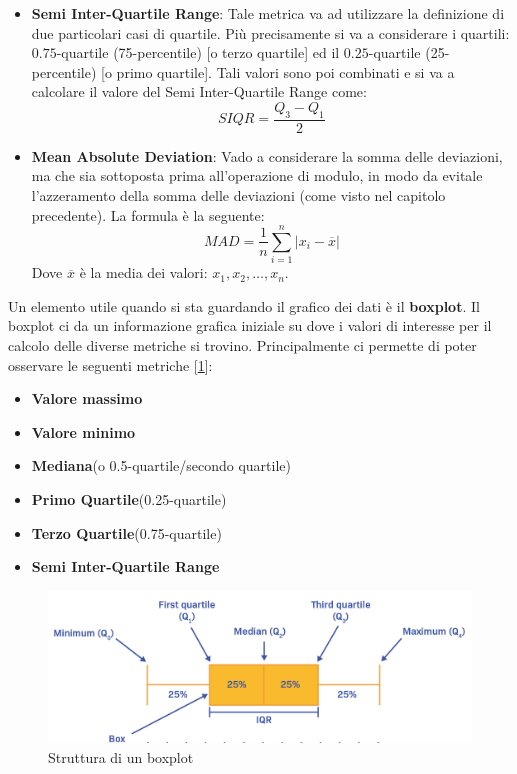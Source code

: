 \begin{itemize}
\item \textbf{Semi Inter-Quartile Range}: Tale metrica va ad utilizzare la definizione di due particolari casi di quartile. Più precisamente si va a considerare i quartili: \(0.75\)-quartile (75-percentile) [o terzo quartile] ed il \(0.25\)-quartile (25-percentile) [o primo quartile]. Tali valori sono poi combinati e si va a calcolare il valore del Semi Inter-Quartile Range come:
\[
SIQR = \frac{Q_3 - Q_1}{2}
\]

\item \textbf{Mean Absolute Deviation}: Vado a considerare la somma delle deviazioni, ma che sia sottoposta prima all'operazione di modulo, in modo da evitale l'azzeramento della somma delle deviazioni (come visto nel capitolo precedente). La formula è la seguente:
\[
MAD = \frac{1}{n}\sum_{i=1}^{n}|x_i - \overline{x}|
\]
Dove \(\overline{x}\) è la media dei valori: \(x_1,x_2, \dots, x_n\).

\end{itemize}

Un elemento utile quando si sta guardando il grafico dei dati è il \textbf{boxplot}. Il boxplot ci da un informazione grafica iniziale su dove i valori di interesse per il calcolo delle diverse metriche si trovino. Principalmente ci permette di poter osservare le seguenti metriche [\ref{img:boxplot}]:
\begin{itemize}
    \item \textbf{Valore massimo}
    \item \textbf{Valore minimo}
    \item \textbf{Mediana}(o 0.5-quartile/secondo quartile)
    \item \textbf{Primo Quartile}(0.25-quartile)
    \item \textbf{Terzo Quartile}(0.75-quartile)
    \item \textbf{Semi Inter-Quartile Range}
\end{itemize}

\begin{figure}[H]
\centering
\includegraphics[width=.7\textwidth]{img/chapter-4/boxplot.png}
\caption{Struttura di un boxplot}\label{img:boxplot}
\end{figure}

